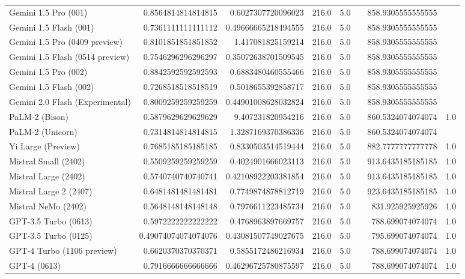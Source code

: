 \begin{table}[htp]
{\begin{tabular}{lrrrrrrr}
Gemini 1.5 Pro (001) & 0.8564814814814815 & 0.6027307720096023 & 216.0 & 5.0 &  & 858.9305555555555 &  \\
Gemini 1.5 Flash (001) & 0.7361111111111112 & 0.49666665218494555 & 216.0 & 5.0 &  & 858.9305555555555 &  \\
Gemini 1.5 Pro (0409 preview) & 0.8101851851851852 & 1.417081825159214 & 216.0 & 5.0 &  & 858.9305555555555 &  \\
Gemini 1.5 Flash (0514 preview) & 0.7546296296296297 & 0.35072638701509545 & 216.0 & 5.0 &  & 858.9305555555555 &  \\
Gemini 1.5 Pro (002) & 0.8842592592592593 & 0.6883480460555466 & 216.0 & 5.0 &  & 858.9305555555555 &  \\
Gemini 1.5 Flash (002) & 0.7268518518518519 & 0.5018655392858717 & 216.0 & 5.0 &  & 858.9305555555555 &  \\
Gemini 2.0 Flash (Experimental) & 0.8009259259259259 & 0.44901008628032824 & 216.0 & 5.0 &  & 858.9305555555555 &  \\
PaLM-2 (Bison) & 0.5879629629629629 & 9.407231820954216 & 216.0 & 5.0 &  & 860.5324074074074 & 1.0 \\
PaLM-2 (Unicorn) & 0.7314814814814815 & 1.3287169370386336 & 216.0 & 5.0 &  & 860.5324074074074 &  \\
Yi Large (Preview) & 0.7685185185185185 & 0.8330503514519444 & 216.0 & 5.0 &  & 882.7777777777778 & 1.0 \\
Mistral Small (2402) & 0.5509259259259259 & 0.4024901666023113 & 216.0 & 5.0 &  & 913.6435185185185 & 1.0 \\
Mistral Large (2402) & 0.5740740740740741 & 0.42108922203381854 & 216.0 & 5.0 &  & 913.6435185185185 & 1.0 \\
Mistral Large 2 (2407) & 0.6481481481481481 & 0.7749874878812719 & 216.0 & 5.0 &  & 923.6435185185185 & 1.0 \\
Mistral NeMo (2402) & 0.5648148148148148 & 0.7976611223485734 & 216.0 & 5.0 &  & 831.925925925926 & 1.0 \\
GPT-3.5 Turbo (0613) & 0.5972222222222222 & 0.4768963897669757 & 216.0 & 5.0 &  & 788.699074074074 & 1.0 \\
GPT-3.5 Turbo (0125) & 0.49074074074074076 & 0.43081507749027675 & 216.0 & 5.0 &  & 795.699074074074 & 1.0 \\
GPT-4 Turbo (1106 preview) & 0.6620370370370371 & 0.5855172486216934 & 216.0 & 5.0 &  & 788.699074074074 & 1.0 \\
GPT-4 (0613) & 0.7916666666666666 & 0.46296725780875597 & 216.0 & 5.0 &  & 788.699074074074 & 1.0 \\

\end{tabular}}
\end{table}
